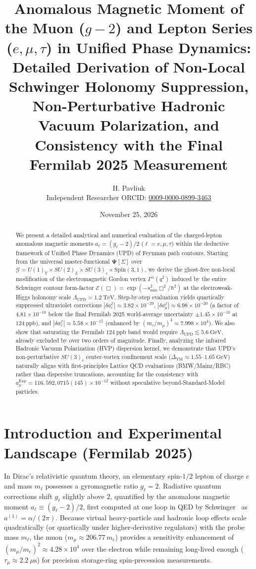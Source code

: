 \documentclass[11pt,a4paper]{article}
\title{\textbf{Anomalous Magnetic Moment of the Muon ($g-2$) and Lepton Series ($e, \mu, \tau$) in Unified Phase Dynamics:}\\
\large Detailed Derivation of Non-Local Schwinger Holonomy Suppression, Non-Perturbative Hadronic Vacuum Polarization, and Consistency with the Final Fermilab 2025 Measurement}
\author{H. Pavliuk\\
\small Independent Researcher \quad ORCID: \href{https://orcid.org/0009-0000-0899-3463}{0009-0000-0899-3463}}
\date{November 25, 2026}
\begin{document}
\maketitle

\begin{abstract}
We present a detailed analytical and numerical evaluation of the charged-lepton anomalous magnetic moments $a_\ell = (g_\ell - 2)/2$ ($\ell = e, \mu, \tau$) within the deductive framework of Unified Phase Dynamics (UPD) of Feynman path contours. Starting from the universal master-functional $\mathbf{\Psi}[\Sigma]$ over $\mathcal{G} = U(1)_Y \times SU(2)_L \times SU(3)_c \times \mathrm{Spin}(3,1)$, we derive the ghost-free non-local modification of the electromagnetic Gordon vertex $\Gamma^\alpha(q^2)$ induced by the entire Schwinger contour form-factor $\mathcal{E}(\Box) = \exp(-s_{\min}^2 \Box^2/\hbar^2)$ at the electroweak-Higgs holonomy scale $\Lambda_{\mathrm{UPD}} = 1.2\ \mathrm{TeV}$. Step-by-step evaluation yields quartically suppressed ultraviolet corrections $|\delta a_e^{\mathcal{E}}| \approx 3.82 \times 10^{-29}$, $|\delta a_\mu^{\mathcal{E}}| \approx 6.98 \times 10^{-20}$ (a factor of $4.81 \times 10^{-10}$ below the final Fermilab 2025 world-average uncertainty $\pm 1.45 \times 10^{-10}$ at $124\ \mathrm{ppb}$), and $|\delta a_\tau^{\mathcal{E}}| \approx 5.58 \times 10^{-15}$ (enhanced by $(m_\tau/m_\mu)^4 \approx 7.998 \times 10^4$). We also show that saturating the Fermilab $124\ \mathrm{ppb}$ band would require $\Lambda_{\mathrm{UPD}} \lesssim 5.6\ \mathrm{GeV}$, already excluded by over two orders of magnitude. Finally, analyzing the infrared Hadronic Vacuum Polarization (HVP) dispersion kernel, we demonstrate that UPD's non-perturbative $SU(3)_c$ center-vortex confinement scale ($\Delta_{\mathrm{YM}} \approx 1.55\text{--}1.65\ \mathrm{GeV}$) naturally aligns with first-principles Lattice QCD evaluations (BMW/Mainz/RBC) rather than dispersive truncations, accounting for the consistency with $a_\mu^{\mathrm{Exp}} = 116,592,0715(145) \times 10^{-12}$ without speculative beyond-Standard-Model particles.
\end{abstract}

\section{Introduction and Experimental Landscape (Fermilab 2025)}
In Dirac's relativistic quantum theory, an elementary spin-$1/2$ lepton of charge $e$ and mass $m_\ell$ possesses a gyromagnetic ratio $g_\ell = 2$. Radiative quantum corrections shift $g_\ell$ slightly above $2$, quantified by the anomalous magnetic moment $a_\ell \equiv (g_\ell - 2)/2$, first computed at one loop in QED by Schwinger~\cite{schwinger1948} as $a^{(1)} = \alpha/(2\pi)$. Because virtual heavy-particle and hadronic loop effects scale quadratically (or quartically under higher-derivative regulators) with the probe mass $m_\ell$, the muon ($m_\mu \approx 206.77\,m_e$) provides a sensitivity enhancement of $(m_\mu/m_e)^2 \approx 4.28 \times 10^4$ over the electron while remaining long-lived enough ($\tau_\mu \approx 2.2\ \mu\mathrm{s}$) for precision storage-ring spin-precession measurements.
\end{document}
